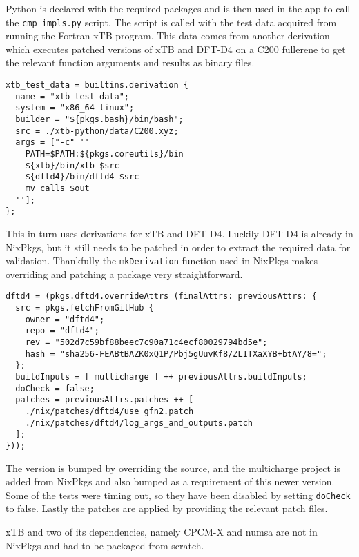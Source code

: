 Python is declared with the required packages and is then used in the app to call the \verb|cmp_impls.py| script. The script is called with the test data acquired from running the Fortran xTB program. This data comes from another derivation which executes patched versions of xTB and DFT-D4 on a C200 fullerene to get the relevant function arguments and results as binary files.

\begin{verbatim}
xtb_test_data = builtins.derivation {
  name = "xtb-test-data";
  system = "x86_64-linux";
  builder = "${pkgs.bash}/bin/bash";
  src = ./xtb-python/data/C200.xyz;
  args = ["-c" ''
    PATH=$PATH:${pkgs.coreutils}/bin
    ${xtb}/bin/xtb $src
    ${dftd4}/bin/dftd4 $src
    mv calls $out
  ''];
};
\end{verbatim}

This in turn uses derivations for xTB and DFT-D4. Luckily DFT-D4 is already in NixPkgs, but it still needs to be patched in order to extract the required data for validation. Thankfully the \verb|mkDerivation| function used in NixPkgs makes overriding and patching a package very straightforward. 

\begin{verbatim}
dftd4 = (pkgs.dftd4.overrideAttrs (finalAttrs: previousAttrs: {
  src = pkgs.fetchFromGitHub {
    owner = "dftd4";
    repo = "dftd4";
    rev = "502d7c59bf88beec7c90a71c4ecf80029794bd5e";
    hash = "sha256-FEABtBAZK0xQ1P/Pbj5gUuvKf8/ZLITXaXYB+btAY/8=";
  };
  buildInputs = [ multicharge ] ++ previousAttrs.buildInputs;
  doCheck = false;
  patches = previousAttrs.patches ++ [
    ./nix/patches/dftd4/use_gfn2.patch
    ./nix/patches/dftd4/log_args_and_outputs.patch
  ];
}));
\end{verbatim}

The version is bumped by overriding the source, and the multicharge project is added from NixPkgs and also bumped as a requirement of this newer version. Some of the tests were timing out, so they have been disabled by setting \verb|doCheck| to false. Lastly the patches are applied by providing the relevant patch files.


xTB and two of its dependencies, namely CPCM-X and numsa are not in NixPkgs and had to be packaged from scratch.
